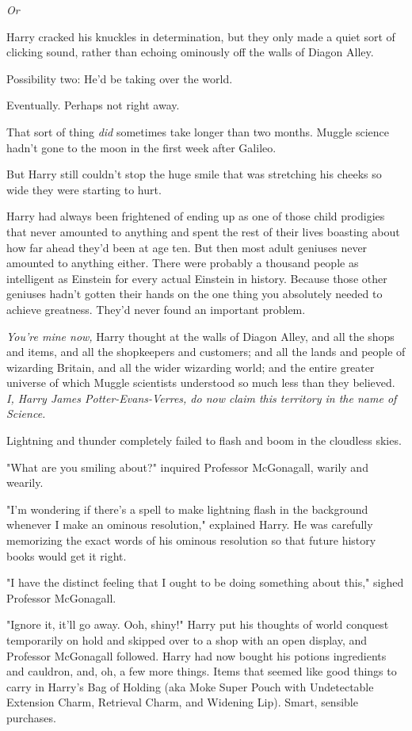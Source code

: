 \emph{Or}{\el}

Harry cracked his knuckles in determination, but they only made a quiet sort of
clicking sound, rather than echoing ominously off the walls of Diagon Alley.

Possibility two: He'd be taking over the world.

Eventually. Perhaps not right away.

That sort of thing \emph{did} sometimes take longer than two months. Muggle
science hadn't gone to the moon in the first week after Galileo.

But Harry still couldn't stop the huge smile that was stretching his cheeks so
wide they were starting to hurt.

Harry had always been frightened of ending up as one of those child prodigies
that never amounted to anything and spent the rest of their lives boasting
about how far ahead they'd been at age ten. But then most adult geniuses never
amounted to anything either. There were probably a thousand people as
intelligent as Einstein for every actual Einstein in history. Because those
other geniuses hadn't gotten their hands on the one thing you absolutely needed
to achieve greatness. They'd never found an important problem.

\emph{You're mine now,} Harry thought at the walls of Diagon Alley, and all the
shops and items, and all the shopkeepers and customers; and all the lands and
people of wizarding Britain, and all the wider wizarding world; and the entire
greater universe of which Muggle scientists understood so much less than they
believed. \emph{I, Harry James Potter-Evans-Verres, do now claim this territory
in the name of Science.}

Lightning and thunder completely failed to flash and boom in the cloudless
skies.

"What are you smiling about?" inquired Professor McGonagall, warily and wearily.

"I'm wondering if there's a spell to make lightning flash in the background
whenever I make an ominous resolution," explained Harry. He was carefully
memorizing the exact words of his ominous resolution so that future history
books would get it right.

"I have the distinct feeling that I ought to be doing something about this,"
sighed Professor McGonagall.

"Ignore it, it'll go away. Ooh, shiny!" Harry put his thoughts of world
conquest temporarily on hold and skipped over to a shop with an open display,
and Professor McGonagall followed.
\sbreak
Harry had now bought his potions ingredients and cauldron, and, oh, a few more
things. Items that seemed like good things to carry in Harry's Bag of Holding
(aka Moke Super Pouch  with Undetectable Extension Charm, Retrieval Charm,
and Widening Lip). Smart, sensible purchases.

